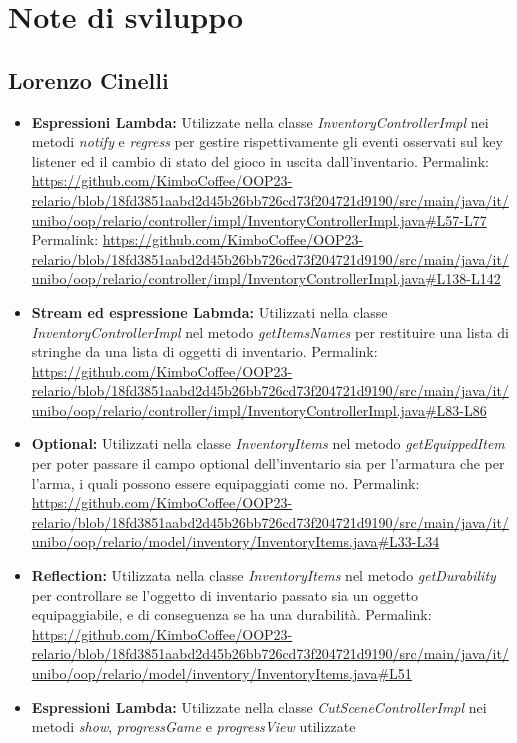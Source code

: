 \documentclass[a4paper,12pt]{report}
\begin{document}
\section{Note di sviluppo}

\subsection{Lorenzo Cinelli}

\begin{itemize}
	\item \textbf{Espressioni Lambda:} Utilizzate nella classe \textit{InventoryControllerImpl} nei metodi \textit{notify} e \textit{regress} per gestire rispettivamente
	gli eventi osservati sul key listener ed il cambio di stato del gioco in uscita dall'inventario.
	Permalink: \url{https://github.com/KimboCoffee/OOP23-relario/blob/18fd3851aabd2d45b26bb726cd73f204721d9190/src/main/java/it/unibo/oop/relario/controller/impl/InventoryControllerImpl.java#L57-L77}
	Permalink: \url{https://github.com/KimboCoffee/OOP23-relario/blob/18fd3851aabd2d45b26bb726cd73f204721d9190/src/main/java/it/unibo/oop/relario/controller/impl/InventoryControllerImpl.java#L138-L142}
	\item \textbf{Stream ed espressione Labmda:} Utilizzati nella classe \textit{InventoryControllerImpl} nel metodo \textit{getItemsNames} per restituire una lista di stringhe
	da una lista di oggetti di inventario.
	Permalink: \url{https://github.com/KimboCoffee/OOP23-relario/blob/18fd3851aabd2d45b26bb726cd73f204721d9190/src/main/java/it/unibo/oop/relario/controller/impl/InventoryControllerImpl.java#L83-L86}
	\item \textbf{Optional:} Utilizzati nella classe \textit{InventoryItems} nel metodo \textit{getEquippedItem} per poter passare il campo optional dell'inventario sia per l'armatura
	che per l'arma, i quali possono essere equipaggiati come no.
	Permalink: \url{https://github.com/KimboCoffee/OOP23-relario/blob/18fd3851aabd2d45b26bb726cd73f204721d9190/src/main/java/it/unibo/oop/relario/model/inventory/InventoryItems.java#L33-L34}
	\item \textbf{Reflection:} Utilizzata nella classe \textit{InventoryItems} nel metodo \textit{getDurability} per controllare se l'oggetto di inventario passato sia un oggetto
	equipaggiabile, e di conseguenza se ha una durabilità.
	Permalink: \url{https://github.com/KimboCoffee/OOP23-relario/blob/18fd3851aabd2d45b26bb726cd73f204721d9190/src/main/java/it/unibo/oop/relario/model/inventory/InventoryItems.java#L51}
	\item \textbf{Espressioni Lambda:} Utilizzate nella classe \textit{CutSceneControllerImpl} nei metodi \textit{show}, \textit{progressGame} e \textit{progressView} utilizzate

\end{itemize}
\end{document}
